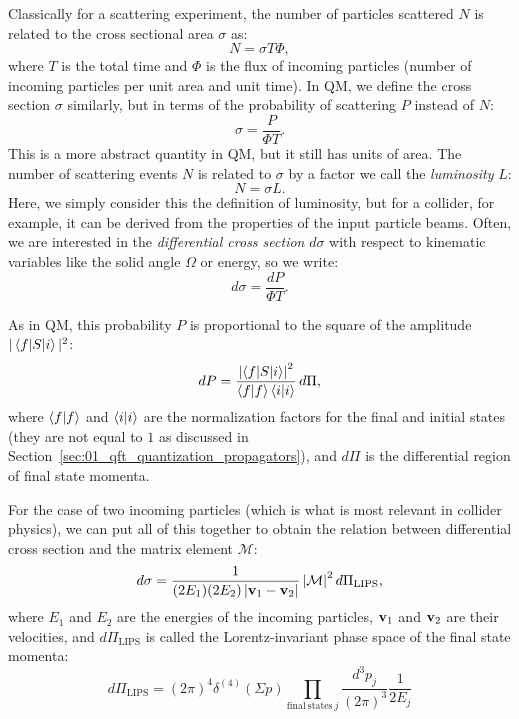 Classically for a scattering experiment, the number of particles scattered $N$ is related to the cross sectional area $\sigma$ as:
\begin{equation}
	\label{eq:01_qft_interactions_cross_section_classical}
	N = \sigma T \Phi,
\end{equation}
where $T$ is the total time and $\Phi$ is the flux of incoming particles (number of incoming particles per unit area and unit time).
In QM, we define the cross section $\sigma$ similarly, but in terms of the probability of scattering $P$ instead of $N$:
\begin{equation}
	\label{eq:01_qft_interactions_cross_section_qm}
	\sigma = \frac{P}{\Phi T}.
\end{equation}
This is a more abstract quantity in QM, but it still has units of area.
The number of scattering events $N$ is related to $\sigma$ by a factor we call the \textit{luminosity} $L$:
\begin{equation}
	\label{eq:01_qft_interactions_cross_section_luminosity}
	N = \sigma L.
\end{equation}
Here, we simply consider this the definition of luminosity, but for a collider, for example, it can be derived from the properties of the input particle beams.
Often, we are interested in the \textit{differential cross section} $d\sigma$ with respect to kinematic variables like the solid angle $\Omega$ or energy, so we write:
\begin{equation}
	\label{eq:01_qft_interactions_cross_section_differential}
	d\sigma = \frac{dP}{\Phi T}.
\end{equation}

As in QM, this probability $P$ is proportional to the square of the amplitude $|\braket{f|S|i}|^2$:
\begin{equation}
	\label{eq:01_qft_interactions_cross_section_probability}
	dP = \frac{\left\lvert \braket{f|S|i} \right\rvert^2}{\braket{f|f}\braket{i|i}}\, d\Pi,
\end{equation}
where $\braket{f|f}$ and $\braket{i|i}$ are the normalization factors for the final and initial states (they are not equal to $1$ as discussed in Section~\ref{sec:01_qft_quantization_propagators}), and $d\Pi$ is the differential region of final state momenta.

For the case of two incoming particles (which is what is most relevant in collider physics), we can put all of this together to obtain the relation between differential cross section and the matrix element $\mathcal M$:
\begin{equation}
	\label{eq:01_qft_interactions_cross_section_matrix_element}
	d\sigma = \frac{1}{(2E_1)(2E_2)\left\lvert \mathbf{v}_1 - \mathbf{v}_2 \right\rvert} \left\lvert \mathcal M \right\rvert^2 d\Pi_{\mathrm{LIPS}},
\end{equation}
where $E_1$ and $E_2$ are the energies of the incoming particles, $\mathbf{v}_1$ and $\mathbf{v}_2$ are their velocities, and $d\Pi_{\mathrm{LIPS}}$ is called the Lorentz-invariant phase space of the final state momenta:
\begin{equation}
	\label{eq:01_qft_interactions_cross_section_lips}
	d\Pi_{\mathrm{LIPS}} = (2\pi)^4 \delta^{(4)}(\Sigma p) \prod_{\mathrm{final\ states}\ j} \frac{d^3p_j}{(2\pi)^3} \frac{1}{2E_j}
\end{equation}

